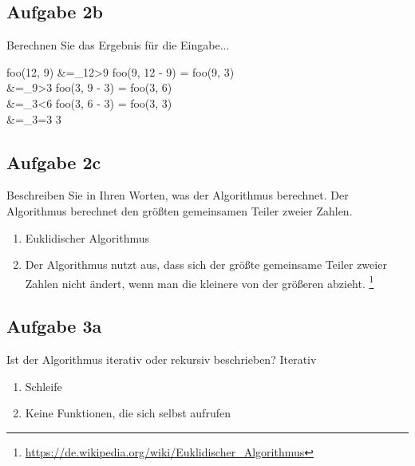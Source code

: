 \documentclass[
	aspectratio=169, 
	10pt 
]{beamer}
\begin{document}
\subsection{Aufgabe 2b}
\begin{frame}{\insertsubsection} 
	\begin{exercise}{Berechnen Sie das Ergebnis für die Eingabe...}
		\begin{flalign*}
			foo(12, 9) &=_{12>9} foo(9, 12 - 9) = foo(9, 3) \\
					   &=_{9>3}  foo(3, 9 - 3)  = foo(3, 6) \\
					   &=_{3<6}  foo(3, 6 - 3)  = foo(3, 3) \\
					   &=_{3=3}  3
		\end{flalign*}	
		\mbox{}
	\end{exercise}
\end{frame}

\subsection{Aufgabe 2c}
\begin{frame}{\insertsubsection} 
	\begin{exercise}{Beschreiben Sie in Ihren Worten, was der Algorithmus berechnet.}
		Der Algorithmus berechnet den größten gemeinsamen Teiler zweier Zahlen.
	\end{exercise}

	\mbox{}

	\begin{enumerate}[$\rightarrow$]
		\item Euklidischer Algorithmus
		\item Der Algorithmus nutzt aus, dass sich der größte gemeinsame Teiler zweier Zahlen nicht ändert, wenn man die kleinere von der größeren abzieht. \footnote[1]{\url{https://de.wikipedia.org/wiki/Euklidischer_Algorithmus}}
	\end{enumerate}
\end{frame}


\subsection{Aufgabe 3a}
\begin{frame}{\insertsubsection} 
	\begin{exercise}{Ist der Algorithmus iterativ oder rekursiv beschrieben?}
		Iterativ
	\end{exercise}

	\mbox{}

	\begin{enumerate}[$\rightarrow$]
		\item Schleife
		\item Keine Funktionen, die sich selbst aufrufen
	\end{enumerate}
\end{frame}
\end{document}
